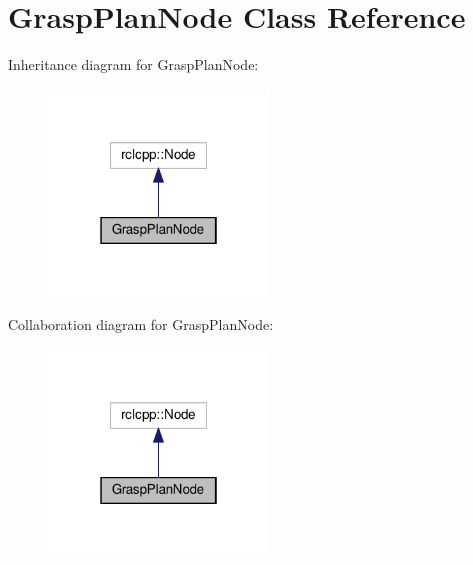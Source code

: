 \hypertarget{classGraspPlanNode}{}\section{Grasp\+Plan\+Node Class Reference}
\label{classGraspPlanNode}


Inheritance diagram for Grasp\+Plan\+Node\+:\nopagebreak
\begin{figure}[H]
\begin{center}
\leavevmode
\includegraphics[width=166pt]{classGraspPlanNode__inherit__graph}
\end{center}
\end{figure}


Collaboration diagram for Grasp\+Plan\+Node\+:\nopagebreak
\begin{figure}[H]
\begin{center}
\leavevmode
\includegraphics[width=166pt]{classGraspPlanNode__coll__graph}
\end{center}
\end{figure}
